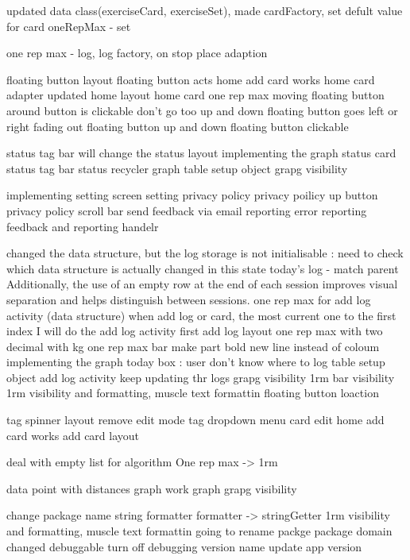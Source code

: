 updated data class(exerciseCard, exerciseSet), made cardFactory, set defult value for card
oneRepMax - set


one rep max - log, log factory, on stop place adaption


floating button layout 
floating button acts
home add card works
home card adapter updated
home layout
home card one rep max
moving floating button around
button is clickable
don't go too up and down
floating button goes left or right
fading out
floating button up and down
floating button clickable


status tag bar
will change the status layout
implementing the graph
status card
status tag bar
status recycler
graph
table setup object
grapg visibility


implementing setting screen
setting privacy policy
privacy poilicy up button
privacy policy scroll bar
send feedback via email
reporting
error reporting
feedback and reporting handelr


changed the data structure, but the log storage is not initialisable 
\todo : need to check which data structure is actually changed in this state
today's log - match parent
Additionally, the use of an empty row at the end of each session improves visual separation and helps distinguish between sessions.
one rep max for add log activity (data structure)
when add log or card, the most current one to the first index
I will do the add log activity first
add log layout
one rep max with two decimal with kg
one rep max bar
make part bold
new line instead of coloum
implementing the graph
today box : user don't know where to log
table setup object
add log activity keep updating thr logs
grapg visibility
1rm bar visibility
1rm visibility and formatting, muscle text formattin
floating button loaction


tag spinner layout
remove edit mode
tag dropdown menu
card edit
home add card works
add card layout


deal with empty list for algorithm
One rep max -> 1rm


data point with distances
graph work
graph
grapg visibility


change package name
string formatter
formatter -> stringGetter
1rm visibility and formatting, muscle text formattin
going to rename packge
package domain changed
debuggable
turn off debugging
version name update
app version


